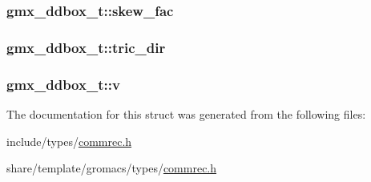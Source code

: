 \hypertarget{structgmx__ddbox__t_affcb74917f4431a27d6e044bafcf6f10}{
\subsubsection[{skew\-\_\-fac}]{ {\bf gmx\-\_\-ddbox\-\_\-t\-::skew\-\_\-fac}}}\label{structgmx__ddbox__t_affcb74917f4431a27d6e044bafcf6f10}
\hypertarget{structgmx__ddbox__t_a89edc2fc52bc259388b85423baf5f6ae}{
\subsubsection[{tric\-\_\-dir}]{ {\bf gmx\-\_\-ddbox\-\_\-t\-::tric\-\_\-dir}}}\label{structgmx__ddbox__t_a89edc2fc52bc259388b85423baf5f6ae}
\hypertarget{structgmx__ddbox__t_a53afe462d7aa177bab06b0676e44f8c1}{
\subsubsection[{v}]{ {\bf gmx\-\_\-ddbox\-\_\-t\-::v}}}\label{structgmx__ddbox__t_a53afe462d7aa177bab06b0676e44f8c1}


\-The documentation for this struct was generated from the following files\-:\begin{DoxyCompactItemize}
\item 
include/types/\hyperlink{include_2types_2commrec_8h}{commrec.\-h}\item 
share/template/gromacs/types/\hyperlink{share_2template_2gromacs_2types_2commrec_8h}{commrec.\-h}\end{DoxyCompactItemize}
